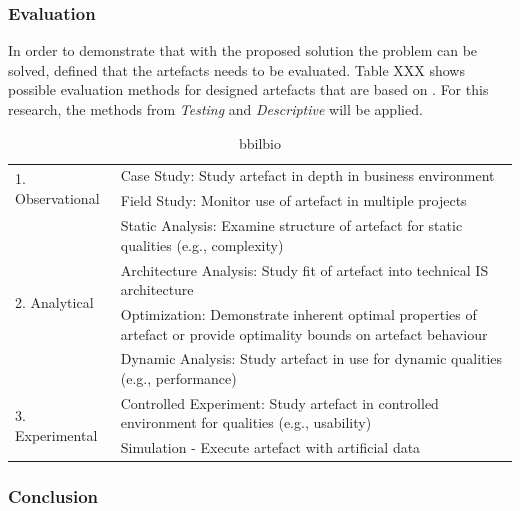 
\subsubsection{Evaluation}

In order to demonstrate that with the proposed solution the problem can be solved, \cite{Hevner2010}  defined that the artefacts needs to be evaluated.
Table XXX shows possible evaluation methods for designed artefacts  that are based on \cite{Hevner2004}. For this research, the methods from \textit{Testing} and \textit{Descriptive} will be applied.


\begin{table}[h]
	\begin{center}
		\begin{tabular}{ | p{4cm} | p{9cm} | } 
			\hline
			\multirow{2}{*}{1. Observational} &
				Case Study: Study artefact in depth in business environment \\
				\cline{2-2}
				& Field Study: Monitor use of artefact in multiple projects \\
			\hline
			\multirow{4}{*}{2. Analytical} &
				Static Analysis: Examine structure of artefact for static qualities (e.g., complexity) \\
				\cline{2-2}
				& Architecture Analysis: Study fit of artefact into technical IS architecture \\
				\cline{2-2}
				& Optimization: Demonstrate inherent optimal properties of artefact or provide optimality bounds on artefact behaviour \\
				\cline{2-2}
				& Dynamic Analysis: Study artefact in use for dynamic qualities (e.g., performance) \\
			\hline
			\multirow{2}{*}{3. Experimental} &
				Controlled Experiment: Study artefact in controlled environment for qualities (e.g., usability) \\
				\cline{2-2}
				& Simulation - Execute artefact with artificial data \\
			\hline
		\end{tabular}
		\caption[here]{bbilbio}
		\label{tbl:designevaluationmethods}
	\end{center}
\end{table}



\subsubsection{Conclusion}

